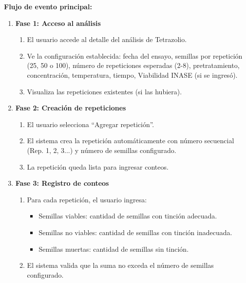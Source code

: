 \vspace{0.5em}
\noindent\textbf{Flujo de evento principal:}
\begin{enumerate}[nosep]
    \item \textbf{Fase 1: Acceso al análisis}
    \begin{enumerate}[nosep]
        \item El usuario accede al detalle del análisis de Tetrazolio.
        \item Ve la configuración establecida: fecha del ensayo, semillas por repetición (25, 50 o 100), número de repeticiones esperadas (2-8), pretratamiento, concentración, temperatura, tiempo, Viabilidad INASE (si se ingresó).
        \item Visualiza las repeticiones existentes (si las hubiera).
    \end{enumerate}

    \item \textbf{Fase 2: Creación de repeticiones}
    \begin{enumerate}[nosep]
        \item El usuario selecciona ``Agregar repetición''.
        \item El sistema crea la repetición automáticamente con número secuencial (Rep. 1, 2, 3...) y número de semillas configurado.
        \item La repetición queda lista para ingresar conteos.
    \end{enumerate}

    \item \textbf{Fase 3: Registro de conteos}
    \begin{enumerate}[nosep]
        \item Para cada repetición, el usuario ingresa:
        \begin{itemize}[nosep]
            \item Semillas viables: cantidad de semillas con tinción adecuada.
            \item Semillas no viables: cantidad de semillas con tinción inadecuada.
            \item Semillas muertas: cantidad de semillas sin tinción.
        \end{itemize}
        \item El sistema valida que la suma no exceda el número de semillas configurado.
    \end{enumerate}


\end{enumerate}
